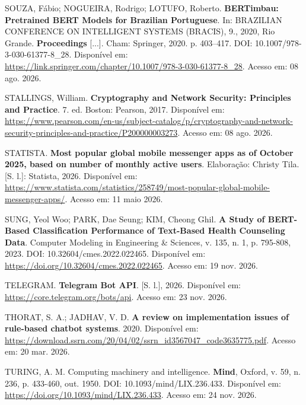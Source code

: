 \documentclass[12pt,a4paper]{extarticle}
\begin{document}
\vspace{0.5cm}\noindent
SOUZA, Fábio; NOGUEIRA, Rodrigo; LOTUFO, Roberto. \textbf{BERTimbau: Pretrained BERT Models for Brazilian Portuguese}. In: BRAZILIAN CONFERENCE ON INTELLIGENT SYSTEMS (BRACIS), 9., 2020, Rio Grande. \textbf{Proceedings} [...]. Cham: Springer, 2020. p. 403--417. DOI: 10.1007/978-3-030-61377-8\_28. Disponível em: \url{https://link.springer.com/chapter/10.1007/978-3-030-61377-8_28}. Acesso em: 08 ago. 2026.

\vspace{0.5cm}\noindent
STALLINGS, William. \textbf{Cryptography and Network Security: Principles and Practice}. 7. ed. Boston: Pearson, 2017. Disponível em: \url{https://www.pearson.com/en-us/subject-catalog/p/cryptography-and-network-security-principles-and-practice/P200000003273}. Acesso em: 08 ago. 2026.

\vspace{0.5cm}\noindent
STATISTA. \textbf{Most popular global mobile messenger apps as of October 2025, based on number of monthly active users}. Elaboração: Christy Tila. [S. l.]: Statista, 2026. Disponível em: \url{https://www.statista.com/statistics/258749/most-popular-global-mobile-messenger-apps/}. Acesso em: 11 maio 2026.

\vspace{0.5cm}\noindent
SUNG, Yeol Woo; PARK, Dae Seung; KIM, Cheong Ghil. \textbf{A Study of BERT-Based Classification Performance of Text-Based Health Counseling Data}. Computer Modeling in Engineering \& Sciences, v. 135, n. 1, p. 795-808, 2023. DOI: 10.32604/cmes.2022.022465. Disponível em: \url{https://doi.org/10.32604/cmes.2022.022465}. Acesso em: 19 nov. 2026.

\vspace{0.5cm}\noindent
TELEGRAM. \textbf{Telegram Bot API}. [S. l.], 2026. Disponível em: \url{https://core.telegram.org/bots/api}. Acesso em: 23 nov. 2026.

\vspace{0.5cm}\noindent
THORAT, S. A.; JADHAV, V. D. \textbf{A review on implementation issues of rule-based chatbot systems}. 2020. Disponível em: \url{https://download.ssrn.com/20/04/02/ssrn_id3567047_code3635775.pdf}. Acesso em: 20 mar. 2026.

\vspace{0.5cm}\noindent
TURING, A. M. Computing machinery and intelligence. \textbf{Mind}, Oxford, v. 59, n. 236, p. 433-460, out. 1950. DOI: 10.1093/mind/LIX.236.433. Disponível em: \url{https://doi.org/10.1093/mind/LIX.236.433}. Acesso em: 24 nov. 2026.
\end{document}
